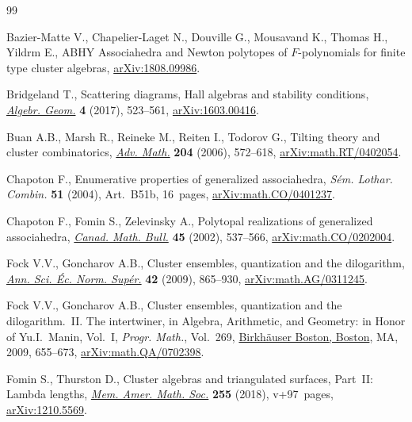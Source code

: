\documentclass[10pt,a4paper]{amsart}
\numberwithin{equation}{section}
\begin{document}
\begin{thebibliography}{99}
\footnotesize\itemsep=0pt

Bazier-Matte V., Chapelier-Laget N., Douville G., Mousavand K., Thomas H.,
 Yildrm E., {ABHY} Associahedra and Newton polytopes of ${F}$-polynomials for
 finite type cluster algebras, \href{https://arxiv.org/abs/1808.09986}{arXiv:1808.09986}.

Bridgeland T., Scattering diagrams, {H}all algebras and stability conditions,
 \href{https://doi.org/10.14231/2017-027}{\textit{Algebr. Geom.}} \textbf{4} (2017), 523--561, \href{https://arxiv.org/abs/1603.00416}{arXiv:1603.00416}.

Buan A.B., Marsh R., Reineke M., Reiten I., Todorov G., Tilting theory and
 cluster combinatorics, \href{https://doi.org/10.1016/j.aim.2005.06.003}{\textit{Adv. Math.}} \textbf{204} (2006), 572--618,
 \href{https://arxiv.org/abs/math.RT/0402054}{arXiv:math.RT/0402054}.

Chapoton F., Enumerative properties of generalized associahedra, \textit{S\'em.
 Lothar. Combin.} \textbf{51} (2004), Art.~B51b, 16~pages,
 \href{https://arxiv.org/abs/math.CO/0401237}{arXiv:math.CO/0401237}.

Chapoton F., Fomin S., Zelevinsky A., Polytopal realizations of generalized
 associahedra, \href{https://doi.org/10.4153/CMB-2002-054-1}{\textit{Canad. Math. Bull.}} \textbf{45} (2002), 537--566,
 \href{https://arxiv.org/abs/math.CO/0202004}{arXiv:math.CO/0202004}.

Fock V.V., Goncharov A.B., Cluster ensembles, quantization and the dilogarithm,
 \href{https://doi.org/10.24033/asens.2112}{\textit{Ann. Sci. \'Ec. Norm. Sup\'er.}} \textbf{42} (2009), 865--930,
 \href{https://arxiv.org/abs/math.AG/0311245}{arXiv:math.AG/0311245}.

Fock V.V., Goncharov A.B., Cluster ensembles, quantization and the
 dilogarithm.~{II}. {T}he intertwiner, in Algebra, Arithmetic, and Geometry:
 in Honor of {Y}u.{I}.~{M}anin, {V}ol.~{I}, \textit{Progr. Math.}, Vol.~269,
 \href{https://doi.org/10.1007/978-0-8176-4745-2_15}{Birkh\"auser Boston, Boston}, MA, 2009, 655--673,
 \href{https://arxiv.org/abs/math.QA/0702398}{arXiv:math.QA/0702398}.

Fomin S., Thurston D., Cluster algebras and triangulated surfaces, {P}art~{II}:
 {L}ambda lengths, \href{https://doi.org/10.1090/memo/1223}{\textit{Mem. Amer. Math. Soc.}} \textbf{255} (2018),
 v+97~pages, \href{https://arxiv.org/abs/1210.5569}{arXiv:1210.5569}.


\end{thebibliography}
\end{document}

